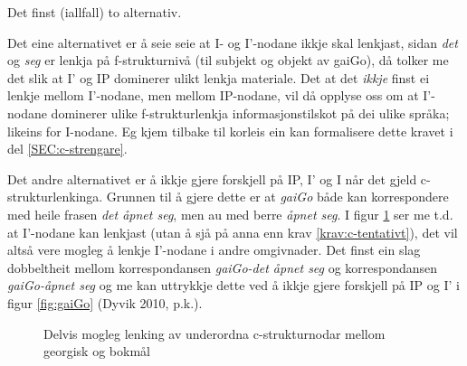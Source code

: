 \documentclass[12pt,a4paper,oneside,draft]{report}
\newcommand{\proj}[2]{\begin{tabular}{c}\footnotesize{#1}\\\normalsize{#2}\end{tabular}}
\newcommand{\ua}{\ensuremath{\uparrow}}
\newcommand{\da}{\ensuremath{\downarrow}}
\begin{document}
Det finst (iallfall) to alternativ. 

Det eine alternativet er å seie seie at I- og I'-nodane ikkje skal
 lenkjast, sidan \emph{det} og \emph{seg} er lenkja på f\hyp{}strukturnivå (til
 subjekt og objekt av gaiGo), då tolker me det slik at I' og IP
 dominerer ulikt lenkja materiale. Det at det \emph{ikkje} finst ei lenkje
 mellom I'-nodane, men mellom IP-nodane, vil då opplyse oss om at
 I'-nodane dominerer ulike f\hyp{}strukturlenkja informasjonstilskot på dei
 ulike språka; likeins for I-nodane. Eg kjem tilbake til korleis ein
 kan formalisere dette kravet i del \ref{SEC:c-strengare}.

Det andre alternativet er å ikkje gjere forskjell på IP, I' og I når
 det gjeld c\hyp{}strukturlenkinga. Grunnen til å gjere dette er at
 \emph{gaiGo} både kan korrespondere med heile frasen \emph{det åpnet seg}, men au
 med berre \emph{åpnet seg}.  I figur \ref{fig:PanJara-gaiGo} ser me
 t.d. at I'-nodane kan lenkjast (utan å sjå på anna enn krav
 \ref{krav:c-tentativt}), det vil altså vere mogleg å lenkje I'-nodane
 i andre omgivnader. Det finst ein slag dobbeltheit mellom
 korrespondansen \emph{gaiGo-det åpnet seg} og korrespondansen \emph{gaiGo-åpnet  seg} og me kan uttrykkje dette ved å ikkje gjere forskjell på IP og
 I' i figur \ref{fig:gaiGo} (Dyvik 2010, p.k.).

\begin{figure}[htp]
\centering
{}
\caption{Delvis mogleg lenking av underordna c\hyp{}strukturnodar mellom georgisk og bokmål}
 \label{fig:PanJara-gaiGo}
\end{figure}
\end{document}
